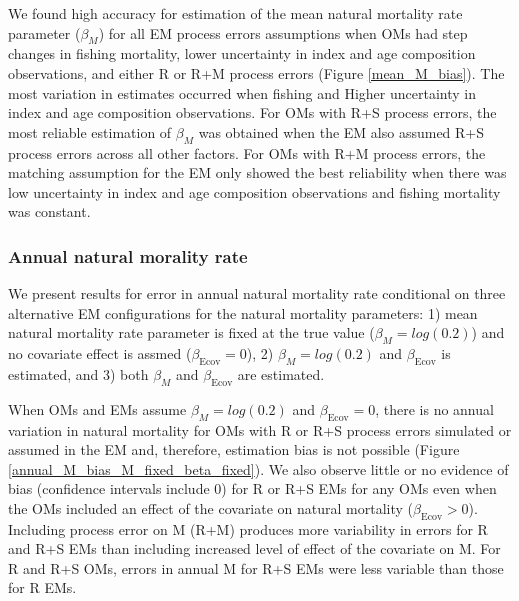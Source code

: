 \documentclass[
  12pt,
]{article}
\begin{document}
We found high accuracy for estimation of the mean natural mortality rate
parameter (\(\beta_M\)) for all EM process errors assumptions when OMs
had step changes in fishing mortality, lower uncertainty in index and
age composition observations, and either R or R+M process errors (Figure
\ref{mean_M_bias}). The most variation in estimates occurred when
fishing and Higher uncertainty in index and age composition
observations. For OMs with R+S process errors, the most reliable
estimation of \(\beta_M\) was obtained when the EM also assumed R+S
process errors across all other factors. For OMs with R+M process
errors, the matching assumption for the EM only showed the best
reliability when there was low uncertainty in index and age composition
observations and fishing mortality was constant.

\hypertarget{annual-natural-morality-rate}{%
\subsubsection*{Annual natural morality
rate}\label{annual-natural-morality-rate}}

We present results for error in annual natural mortality rate
conditional on three alternative EM configurations for the natural
mortality parameters: 1) mean natural mortality rate parameter is fixed
at the true value (\(\beta_M = log(0.2)\)) and no covariate effect is
assmed (\(\beta_\text{Ecov} = 0\)), 2) \(\beta_M = log(0.2)\) and
\(\beta_\text{Ecov}\) is estimated, and 3) both \(\beta_M\) and
\(\beta_\text{Ecov}\) are estimated.

When OMs and EMs assume \(\beta_M = log(0.2)\) and
\(\beta_\text{Ecov} = 0\), there is no annual variation in natural
mortality for OMs with R or R+S process errors simulated or assumed in
the EM and, therefore, estimation bias is not possible (Figure
\ref{annual_M_bias_M_fixed_beta_fixed}). We also observe little or no
evidence of bias (confidence intervals include 0) for R or R+S EMs for
any OMs even when the OMs included an effect of the covariate on natural
mortality (\(\beta_\text{Ecov} > 0\)). Including process error on M
(R+M) produces more variability in errors for R and R+S EMs than
including increased level of effect of the covariate on M. For R and R+S
OMs, errors in annual M for R+S EMs were less variable than those for R
EMs.
\end{document}

